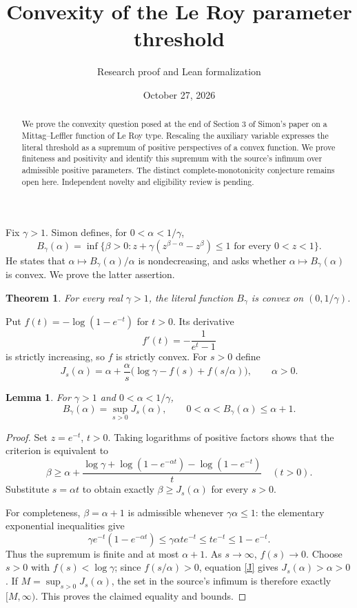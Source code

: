 \documentclass[11pt]{article}
\title{Convexity of the Le Roy parameter threshold}
\author{Research proof and Lean formalization}
\date{October 27, 2026}
\newtheorem{theorem}{Theorem}
\newtheorem{lemma}{Lemma}
\begin{document}
\maketitle
\begin{abstract}
We prove the convexity question posed at the end of Section 3 of Simon's paper on a Mittag--Leffler function of Le Roy type. Rescaling the auxiliary variable expresses the literal threshold as a supremum of positive perspectives of a convex function. We prove finiteness and positivity and identify this supremum with the source's infimum over admissible positive parameters. The distinct complete-monotonicity conjecture remains open here. Independent novelty and eligibility review is pending.
\end{abstract}

Fix $\gamma>1$. Simon \cite[p.~5, Section 3]{Simon} defines, for $0<\alpha<1/\gamma$,
\[
 B_\gamma(\alpha)=\inf\{\beta>0:
 z+\gamma(z^{\beta-\alpha}-z^\beta)\leq1\text{ for every }0<z<1\}.
\]
He states that $\alpha\mapsto B_\gamma(\alpha)/\alpha$ is nondecreasing, and asks whether $\alpha\mapsto B_\gamma(\alpha)$ is convex. We prove the latter assertion.
\begin{theorem}
For every real $\gamma>1$, the literal function $B_\gamma$ is convex on $(0,1/\gamma)$.
\end{theorem}

Put $f(t)=-\log(1-e^{-t})$ for $t>0$. Its derivative
\[
 f'(t)=-\frac{1}{e^t-1}
\]
is strictly increasing, so $f$ is strictly convex. For $s>0$ define
\begin{equation}\label{J}
 J_s(\alpha)=\alpha+\frac{\alpha}{s}
       \bigl(\log\gamma-f(s)+f(s/\alpha)\bigr),\qquad\alpha>0.
\end{equation}

\begin{lemma}\label{representation}
For $\gamma>1$ and $0<\alpha<1/\gamma$,
\[
 B_\gamma(\alpha)=\sup_{s>0}J_s(\alpha),\qquad
 0<\alpha< B_\gamma(\alpha)\leq\alpha+1.
\]
\end{lemma}
\begin{proof}
Set $z=e^{-t}$, $t>0$. Taking logarithms of positive factors shows that the criterion is equivalent to
\[
 \beta\geq \alpha+
 \frac{\log\gamma+\log(1-e^{-\alpha t})-\log(1-e^{-t})}{t}
 \quad(t>0).
\]
Substitute $s=\alpha t$ to obtain exactly $\beta\geq J_s(\alpha)$ for every $s>0$.

For completeness, $\beta=\alpha+1$ is admissible whenever $\gamma\alpha\leq1$: the elementary exponential inequalities give
\[
 \gamma e^{-t}(1-e^{-\alpha t})
 \leq\gamma\alpha te^{-t}\leq te^{-t}\leq1-e^{-t}.
\]
Thus the supremum is finite and at most $\alpha+1$. As $s\to\infty$, $f(s)\to0$. Choose $s>0$ with $f(s)<\log\gamma$; since $f(s/\alpha)>0$, equation \eqref{J} gives $J_s(\alpha)>\alpha>0$. If $M=\sup_{s>0}J_s(\alpha)$, the set in the source's infimum is therefore exactly $[M,\infty)$. This proves the claimed equality and bounds.
\end{proof}
\end{document}
